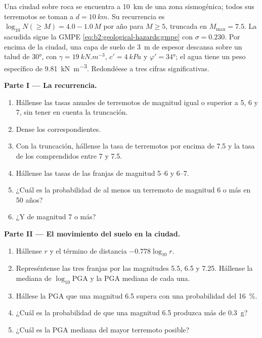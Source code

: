 \begin{problem}\label{pb:b2:geological-hazards:1}
Una ciudad sobre roca se encuentra a \qty{10}{km} de una zona sismogénica; todos sus terremotos se toman a
$d = \qty{10}{km}$. Su recurrencia es $\log_{10} N(\geq M) = 4.0 - 1.0\,M$ por año para $M \geq 5$,
truncada en $M_{\max} = 7.5$. La sacudida sigue la GMPE \eqref{eq:b2:geological-hazards:gmpe}
con $\sigma = 0.230$. Por encima de la ciudad, una capa de suelo de \qty{3}{m} de espesor descansa sobre un talud de \ang{30},
con $\gamma = \qty{19}{kN.m^{-3}}$, $c' = \qty{4}{kPa}$ y $\varphi' = \ang{34}$; el agua tiene un peso
específico de \qty{9.81}{kN.m^{-3}}. Redondéese a tres cifras significativas.

\noindent\textbf{Parte I --- La recurrencia.}
\begin{enumerate}
  \item Hállense las tasas anuales de terremotos de magnitud igual o superior a 5, 6 y 7, sin tener en cuenta la
        truncación.
  \item Dense los  correspondientes.
  \item Con la truncación, hállense la tasa de terremotos por encima de 7.5 y la tasa de los comprendidos entre 7
        y 7.5.
  \item Hállense las tasas de las franjas de magnitud 5--6 y 6--7.
  \item ¿Cuál es la probabilidad de al menos un terremoto de magnitud 6 o más en 50 años?
  \item ¿Y de magnitud 7 o más?
\end{enumerate}

\noindent\textbf{Parte II --- El movimiento del suelo en la ciudad.}
\begin{enumerate}[resume]
  \item Hállense $r$ y el término de distancia $-0.778\log_{10} r$.
  \item Represéntense las tres franjas por las magnitudes 5.5, 6.5 y 7.25. Hállense la mediana de
        $\log_{10}\mathrm{PGA}$ y la PGA mediana de cada una.
  \item Hállese la PGA que una magnitud 6.5 supera con una probabilidad del \qty{16}{\percent}.
  \item ¿Cuál es la probabilidad de que una magnitud 6.5 produzca más de \qty{0.3}{g}?
  \item ¿Cuál es la PGA mediana del mayor terremoto posible?
\end{enumerate}


\end{problem}
